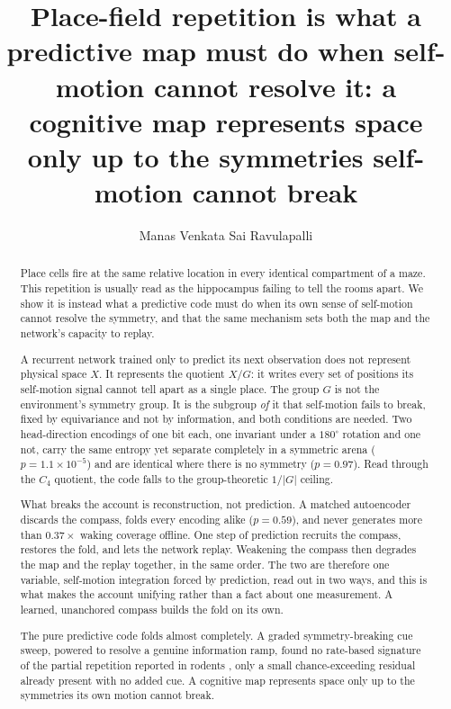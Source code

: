 \documentclass[9pt,lineno]{elife}
\title{Place-field repetition is what a predictive map must do when self-motion cannot resolve it:
a cognitive map represents space only up to the symmetries self-motion cannot break}
\author[1]{Manas Venkata Sai Ravulapalli}
\affil[1]{Ashoka University, Sonipat, India}
\begin{document}
\maketitle

\begin{abstract}
\noindent
Place cells fire at the same relative location in every identical compartment of a maze. This
repetition is usually read as the hippocampus failing to tell the rooms apart. We show it is instead
what a predictive code must do when its own sense of self-motion cannot resolve the symmetry, and that
the same mechanism sets both the map and the network's capacity to replay.

A recurrent network trained only to predict its next observation \citep{levenstein2024} does not
represent physical space $X$. It represents the quotient $X/G$: it writes every set of positions its
self-motion signal cannot tell apart as a single place. The group $G$ is not the environment's
symmetry group. It is the subgroup \emph{of} it that self-motion fails to break, fixed by equivariance
and not by information, and both conditions are needed. Two head-direction encodings of one bit each,
one invariant under a $180^\circ$ rotation and one not, carry the same entropy yet separate completely
in a symmetric arena ($p=1.1\times10^{-5}$) and are identical where there is no symmetry ($p=0.97$).
Read through the $C_4$ quotient, the code falls to the group-theoretic $1/|G|$ ceiling.

What breaks the account is reconstruction, not prediction. A matched autoencoder discards the compass,
folds every encoding alike ($p=0.59$), and never generates more than $0.37\times$ waking coverage
offline. One step of prediction recruits the compass, restores the fold, and lets the network replay.
Weakening the compass then degrades the map and the replay together, in the same order. The two are
therefore one variable, self-motion integration forced by prediction, read out in two ways, and this
is what makes the account unifying rather than a fact about one measurement. A learned, unanchored
compass builds the fold on its own.

The pure predictive code folds almost completely. A graded symmetry-breaking cue sweep, powered to
resolve a genuine information ramp, found no rate-based signature of the partial repetition reported
in rodents \citep{spiers2015}, only a small chance-exceeding residual already present with no added
cue. A cognitive map represents space only up to the symmetries its own motion cannot break.
\end{abstract}
\end{document}
